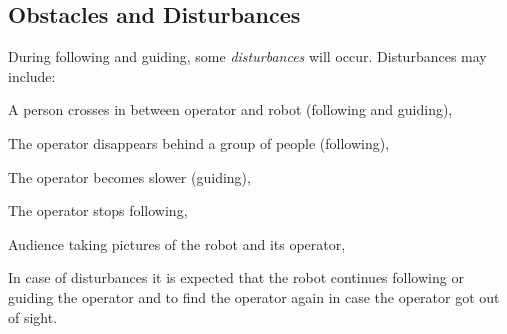 \subsection{Obstacles and Disturbances}
During following and guiding, some \emph{disturbances} will occur. 
Disturbances may include:
\begin{compactitem}
\item A person crosses in between operator and robot (following and guiding), 
\item The operator disappears behind a group of people (following),
\item The operator becomes slower (guiding),
\item The operator stops following,
\item Audience taking pictures of the robot and its operator,
\end{compactitem}
In case of disturbances it is expected that the robot continues following or guiding the operator and to find the operator again in case the operator got out of sight.

